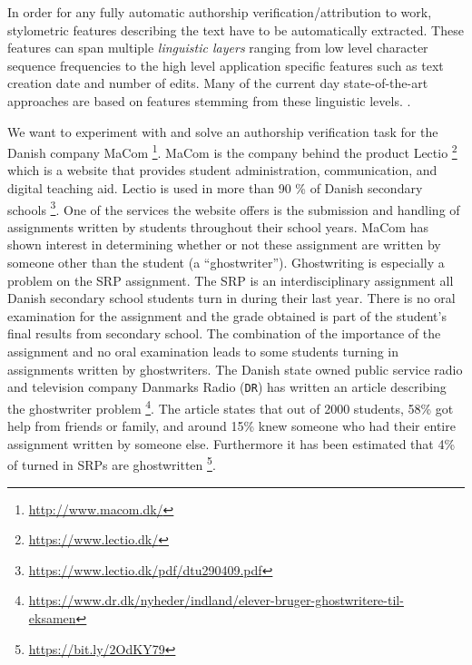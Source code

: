 In order for any fully automatic authorship verification/attribution to work,
stylometric features describing the text have to be automatically extracted.
These features can span multiple \textit{linguistic layers} ranging from low
level character sequence frequencies to the high level application specific
features such as text creation date and number of edits. Many of the current day
state-of-the-art approaches are based on features stemming from these
linguistic levels. \citep{stamatos2009}.


We want to experiment with and solve an authorship verification task for the
Danish company MaCom \footnote{\url{http://www.macom.dk/}}. MaCom is the
company behind the product Lectio \footnote{\url{https://www.lectio.dk/}}
which is a website that provides student administration, communication, and
digital teaching aid. Lectio is used in more than 90 \% of Danish secondary
schools \footnote{\url{https://www.lectio.dk/pdf/dtu290409.pdf}}. One of the
services the website offers is the submission and handling of assignments
written by students throughout their school years. MaCom has shown interest
in determining whether or not these assignment are written by someone
other than the student (a ``ghostwriter''). Ghostwriting is especially a
problem on the \gls{SRP} assignment. The \gls{SRP} is an interdisciplinary
assignment all Danish secondary school students turn in during their
last year. There is no oral examination for the assignment and the grade
obtained is part of the student's final results from secondary school. The
combination of the importance of the assignment and no oral examination
leads to some students turning in assignments written by ghostwriters. The
Danish state owned public service radio and television company Danmarks Radio
(\texttt{DR}) has written an article describing the ghostwriter problem
\footnote{\url{https://www.dr.dk/nyheder/indland/elever-bruger-ghostwritere-til-
eksamen}}. The article states that out of 2000 students, 58\% got
help from friends or family, and around 15\% knew someone who had
their entire assignment written by someone else. Furthermore it has
been estimated that 4\% of turned in \glspl{SRP} are ghostwritten
\footnote{\url{https://bit.ly/2OdKY79}}.


